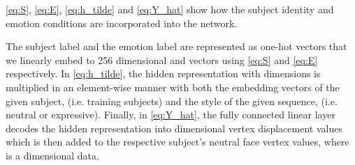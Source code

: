 \documentclass[10pt,twocolumn,letterpaper]{article}
\begin{document}
\cref{eq:S}, \cref{eq:E}, \cref{eq:h_tilde} and \cref{eq:Y_hat} show how the subject identity and emotion conditions are incorporated into the network.


\vspace{-1.5em}

\vspace{-1.5em}

\vspace{-1.5em}


The subject label and the emotion label are represented as one-hot vectors that we linearly embed to 256 dimensional  and  vectors using \cref{eq:S} and \cref{eq:E} respectively. In \cref{eq:h_tilde}, the hidden representation  with dimensions  is multiplied in an element-wise manner with both the embedding vectors of the given subject,  (i.e. training subjects) and the style of the given sequence,  (i.e. neutral or expressive). Finally, in \cref{eq:Y_hat}, the fully connected linear layer decodes the hidden representation into  dimensional vertex displacement values which is then added to the respective subject's neutral face vertex values, where  is a  dimensional data. 
\end{document}
